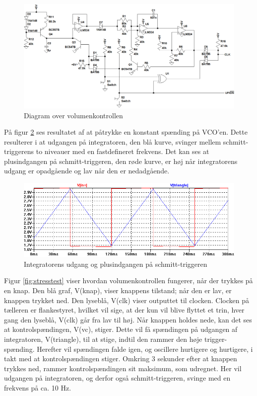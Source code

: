 \begin{figure}[h]
\centering
\includegraphics[width=\textwidth]{teknisk/volumenkontrol/diagram.png}
\caption{Diagram over volumenkontrollen}
\label{fig:volumenkontrol-diagram}
\end{figure}

På figur \ref{fig:vco-signal} ses resultatet af at påtrykke en konstant spænding på VCO'en. Dette resulterer i at udgangen på integratoren, den blå kurve, svinger mellem schmitt-triggerens to niveauer med en fastdefineret frekvens. Det kan ses at plusindgangen på schmitt-triggeren, den røde kurve, er høj når integratorens udgang er opadgående og lav når den er nedadgående. 

\begin{figure}[h]
\centering
\includegraphics[width=\textwidth]{teknisk/volumenkontrol/vco-signal.png}
\caption{Integratorens udgang og plusindgangen på schmitt-triggeren}
\label{fig:vco-signal}
\end{figure}

Figur \ref{fig:stresstest} viser hvordan volumenkontrollen fungerer, når der trykkes på en knap. Den blå graf, V(knap), viser knappens tilstand; når den er lav, er knappen trykket ned. Den lyseblå, V(clk) viser outputtet til clocken. Clocken på tælleren er flankestyret, hvilket vil sige, at der kun vil blive flyttet et trin, hver gang den lyseblå, V(clk) går fra lav til høj. Når knappen holdes nede, kan det ses at kontrolspændingen, V(vc), stiger. Dette vil få spændingen på udgangen af integratoren, V(triangle), til at stige, indtil den rammer den høje trigger-spænding. Herefter vil spændingen falde igen, og oscillere hurtigere og hurtigere, i takt med at kontrolspændingen stiger. Omkring 3 sekunder efter at knappen trykkes ned, rammer kontrolspændingen sit maksimum, som udregnet. Her vil udgangen på integratoren, og derfor også schmitt-triggeren, svinge med en frekvens på ca. 10 Hz.


